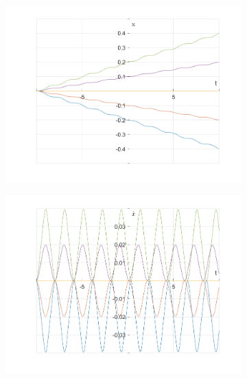 \documentclass{article}
\begin{document}
	\begin{figure}[h!]
		\centering
		\begin{subfigure}[b]{0.48\linewidth}
			\includegraphics[width=\linewidth]{./SmallOscillations/S5/F3.png}
		\end{subfigure}
		\begin{subfigure}[b]{0.48\linewidth}
			\includegraphics[width=\linewidth]{./SmallOscillations/S5/F4.png}
		\end{subfigure}
	\end{figure}
\end{document}
